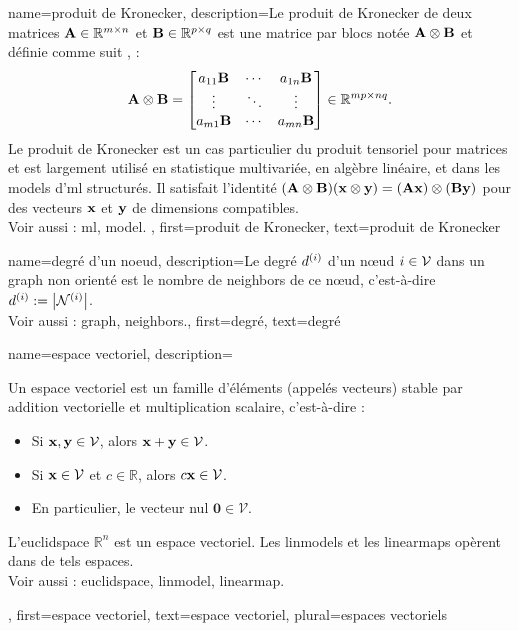 {name={produit de Kronecker}, 
	description={Le produit de Kronecker  de deux matrices ${\bf A} \in \mathbb{R}^{m \times n}$ 
		et ${\bf B} \in \mathbb{R}^{p \times q}$ est une matrice par blocs notée ${\bf A} \otimes {\bf B}$ 
		et définie comme suit \cite{GolubVanLoanBook}, \cite{HornMatAnalysis} :
		\[
		{\bf A} \otimes {\bf B} =
		\begin{bmatrix}
			a_{11}{\bf B} & \cdots & a_{1n}{\bf B} \\
			\vdots & \ddots & \vdots \\
			a_{m1}{\bf B} & \cdots & a_{mn}{\bf B}
		\end{bmatrix}
		\in \mathbb{R}^{mp \times nq}.
		\]
		Le produit de Kronecker est un cas particulier du produit tensoriel pour matrices et est largement utilisé en statistique multivariée, en algèbre linéaire, et dans les \glspl{model} d'\gls{ml} structurés.  
		Il satisfait l’identité $({\bf A} \otimes {\bf B})({\bf x} \otimes {\bf y}) = ({\bf A}{\bf x}) \otimes ({\bf B}{\bf y})$ pour des vecteurs ${\bf x}$ et ${\bf y}$ de dimensions compatibles.
		\\
		Voir aussi : \gls{ml}, \gls{model}. },
	first={produit de Kronecker},
	text={produit de Kronecker} 
}

{name={degré d’un noeud},
	description={Le degré $d^{(i)}$ d’un nœud $i \in \mathcal{V}$ 
		dans un \gls{graph} non orienté est le nombre de \gls{neighbors} de ce nœud, c’est-à-dire 
		$d^{(i)} := \big|\mathcal{N}^{(i)}\big|$.
		\\ 
		Voir aussi : \gls{graph}, \gls{neighbors}.},
	first={degré},
	text={degré} 
}

{name={espace vectoriel},
	description={Un espace vectoriel est un famille d’éléments 
		(appelés vecteurs) stable par addition vectorielle et multiplication scalaire, c’est-à-dire :
		\begin{itemize}
			\item Si ${\bf x}, {\bf y} \in \mathcal{V}$, alors ${\bf x} + {\bf y} \in \mathcal{V}$.
			\item Si ${\bf x} \in \mathcal{V}$ et $c \in \mathbb{R}$, alors $c {\bf x} \in \mathcal{V}$.
			\item En particulier, le vecteur nul $\mathbf{0} \in \mathcal{V}$.
		\end{itemize}
		L’\gls{euclidspace} $\mathbb{R}^n$ est un espace vectoriel.
		Les \glspl{linmodel} et les \glspl{linearmap} opèrent dans de tels espaces.
		\\
		Voir aussi : \gls{euclidspace}, \gls{linmodel}, \gls{linearmap}.},
	first={espace vectoriel},
	text={espace vectoriel}, plural={espaces vectoriels}
}